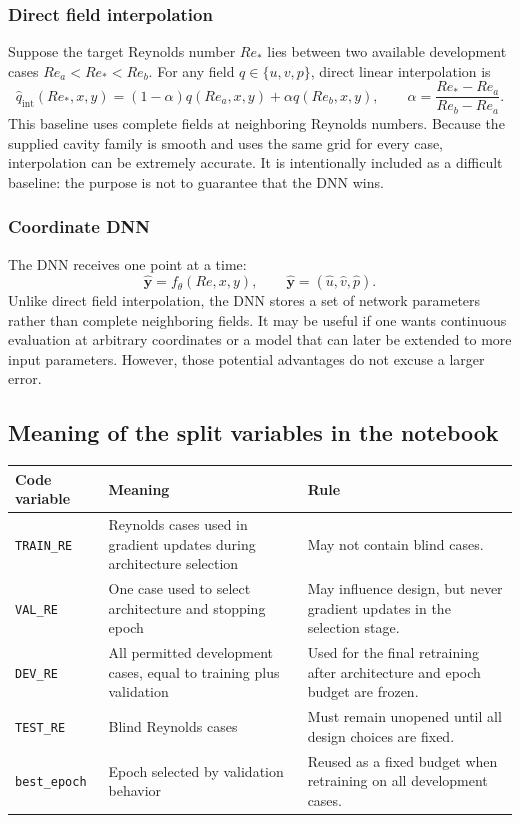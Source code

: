 \documentclass[11pt]{article}
\begin{document}
\subsubsection{Direct field interpolation}
Suppose the target Reynolds number $Re_*$ lies between two available development cases $Re_a<Re_*<Re_b$. For any field $q\in\{u,v,p\}$, direct linear interpolation is
\[
\widehat q_{\mathrm{int}}(Re_*,x,y)
=(1-\alpha)q(Re_a,x,y)+\alpha q(Re_b,x,y),
\qquad
\alpha=\frac{Re_*-Re_a}{Re_b-Re_a}.
\]
This baseline uses complete fields at neighboring Reynolds numbers. Because the supplied cavity family is smooth and uses the same grid for every case, interpolation can be extremely accurate. It is intentionally included as a difficult baseline: the purpose is not to guarantee that the DNN wins.

\subsubsection{Coordinate DNN}
The DNN receives one point at a time:
\[
\widehat{\mathbf y}=f_{\theta}(Re,x,y),
\qquad \widehat{\mathbf y}=(\hat u,\hat v,\hat p).
\]
Unlike direct field interpolation, the DNN stores a set of network parameters rather than complete neighboring fields. It may be useful if one wants continuous evaluation at arbitrary coordinates or a model that can later be extended to more input parameters. However, those potential advantages do not excuse a larger error.

\subsection{Meaning of the split variables in the notebook}
\begin{tabularx}{\textwidth}{@{}p{}p{}Y@{}}
\toprule
\textbf{Code variable} & \textbf{Meaning} & \textbf{Rule}\\
\midrule
\texttt{TRAIN\_RE} & Reynolds cases used in gradient updates during architecture selection & May not contain blind cases.\\
\texttt{VAL\_RE} & One case used to select architecture and stopping epoch & May influence design, but never gradient updates in the selection stage.\\
\texttt{DEV\_RE} & All permitted development cases, equal to training plus validation & Used for the final retraining after architecture and epoch budget are frozen.\\
\texttt{TEST\_RE} & Blind Reynolds cases & Must remain unopened until all design choices are fixed.\\
\texttt{best\_epoch} & Epoch selected by validation behavior & Reused as a fixed budget when retraining on all development cases.\\
\bottomrule
\end{tabularx}
\end{document}

